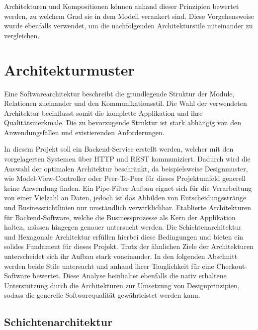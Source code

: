Architekturen und Kompositionen können anhand dieser Prinzipien bewertet werden, zu welchem Grad sie in dem Modell verankert sind. Diese Vorgehensweise wurde ebenfalls verwendet, um die nachfolgenden Architekturstile miteinander zu vergleichen. 

\section{Architekturmuster}


Eine Softwarearchitektur beschreibt die grundlegende Struktur der Module, Relationen zueinander und den Kommunikationsstil. Die Wahl der verwendeten Architektur beeinflusst somit die komplette Applikation und ihre Qualitätsmerkmale. Die zu bevorzugende Struktur ist stark abhängig von den Anwendungsfällen und existierenden Anforderungen. 

In diesem Projekt soll ein Backend-Service erstellt werden, welcher mit den vorgelagerten Systemen über HTTP und REST kommuniziert. Dadurch wird die Auswahl der optimalen Architektur beschränkt, da beispielsweise Designmuster, wie Model-View-Controller oder Peer-To-Peer für dieses Projektumfeld generell keine Anwendung finden.  Ein Pipe-Filter Aufbau eignet sich für die Verarbeitung von einer Vielzahl an Daten, jedoch ist das Abbilden von Entscheidungsstränge und Businessrichtlinien nur umständlich verwirklichbar. Etablierte Architekturen für Backend-Software, welche die Businessprozesse als Kern der Applikation halten, müssen hingegen genauer untersucht werden. Die Schichtenarchitektur und Hexagonale Architektur erfüllen hierbei diese Bedingungen und bieten ein solides Fundament für dieses Projekt. Trotz der ähnlichen Ziele der Architekturen unterscheidet sich ihr Aufbau stark voneinander. In den folgenden Abschnitt werden beide Stile untersucht und anhand ihrer Tauglichkeit für eine Checkout-Software bewertet. Diese Analyse beinhaltet ebenfalls die nativ erhaltene Unterstützung durch die Architekturen zur Umsetzung von Designprinzipien, sodass die generelle Softwarequalität gewährleistet werden kann. 

\subsection{Schichtenarchitektur}


